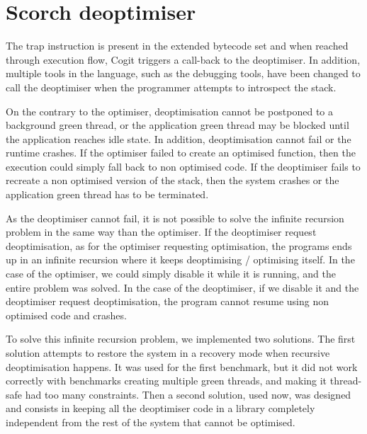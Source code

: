 \documentclass[a4paper,12pt,twoside]{../includes/ThesisStyle}
\begin{document}





\section{Scorch deoptimiser}

The trap instruction is present in the extended bytecode set and when reached through execution flow, Cogit triggers a call-back to the deoptimiser. In addition, multiple tools in the language, such as the debugging tools, have been changed to call the deoptimiser when the programmer attempts to introspect the stack.

On the contrary to the optimiser, deoptimisation cannot be postponed to a background green thread, or the application green thread may be blocked until the application reaches idle state. In addition, deoptimisation cannot fail or the runtime crashes. If the optimiser failed to create an optimised function, then the execution could simply fall back to non optimised code. If the deoptimiser fails to recreate a non optimised version of the stack, then the system crashes or the application green thread has to be terminated.


As the deoptimiser cannot fail, it is not possible to solve the infinite recursion problem in the same way than the optimiser. If the deoptimiser request deoptimisation, as for the optimiser requesting optimisation, the programs ends up in an infinite recursion where it keeps deoptimising / optimising itself. In the case of the optimiser, we could simply disable it while it is running, and the entire problem was solved. In the case of the deoptimiser, if we disable it and the deoptimiser request deoptimisation, the program cannot resume using non optimised code and crashes. 

To solve this infinite recursion problem, we implemented two solutions. The first solution attempts to restore the system in a recovery mode when recursive deoptimisation happens. It was used for the first benchmark, but it did not work correctly with benchmarks creating multiple green threads, and making it thread-safe had too many constraints. Then a second solution, used now, was designed and consists in keeping all the deoptimiser code in a library completely independent from the rest of the system that cannot be optimised.
\end{document}
